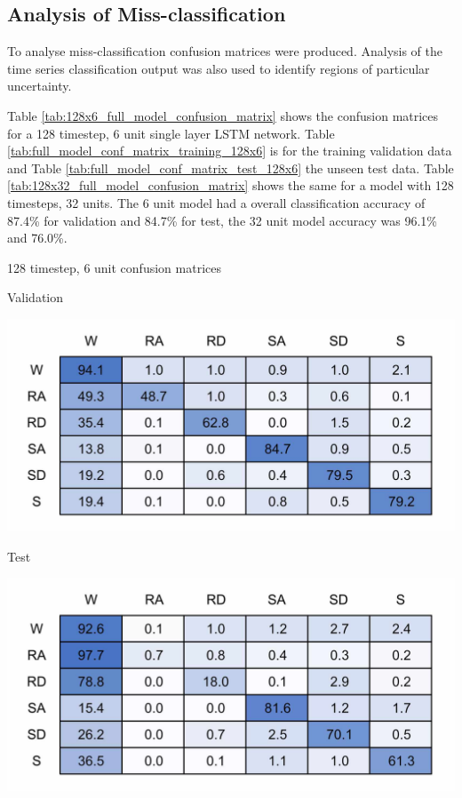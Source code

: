 \documentclass[sensors,article,submit,moreauthors,pdftex]{Definitions/mdpi}
\begin{document}
\subsection{Analysis of Miss-classification}
To analyse miss-classification confusion matrices were produced. Analysis of the time series classification output was also used to identify regions of particular uncertainty.

Table \ref{tab:128x6_full_model_confusion_matrix} shows the confusion matrices for a 128 timestep, 6 unit single layer LSTM network. Table \ref{tab:full_model_conf_matrix_training_128x6} is for the training validation data and Table \ref{tab:full_model_conf_matrix_test_128x6} the unseen test data. Table \ref{tab:128x32_full_model_confusion_matrix} shows the same for a model with 128 timesteps, 32 units. The 6 unit model had a overall classification accuracy of 87.4\% for validation and 84.7\% for test, the 32 unit model accuracy was 96.1\% and 76.0\%.

\begin{table}[!hbt]
    \centering
    \caption{128 timestep, 6 unit confusion matrices}
    \label{tab:128x6_full_model_confusion_matrix}
    \begin{subtable}{.45\textwidth}
        \centering
        \caption{Validation}
        \label{tab:full_model_conf_matrix_training_128x6}
        \includegraphics[width=\textwidth]{Figures/results/conf_matricies/Training_128x6_NT.jpg}
    \end{subtable}
    \hfil
    \begin{subtable}{.45\textwidth}
        \centering
        \caption{Test}
        \label{tab:full_model_conf_matrix_test_128x6}
        \includegraphics[width=\textwidth]{Figures/results/conf_matricies/Test_128x6_NT.jpg}
    \end{subtable}
\end{table}
\end{document}
